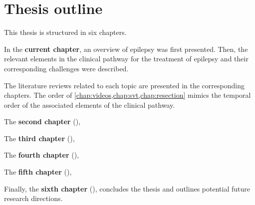 \section{Thesis outline}


This thesis is structured in six chapters.

In the \textbf{current chapter}, an overview of epilepsy was first presented.
Then, the relevant elements in the clinical pathway for the treatment of epilepsy and their corresponding challenges were described.

The literature reviews related to each topic are presented in the corresponding chapters.
The order of \cref{chap:videos,chap:svt,chap:resection} mimics the temporal order of the associated elements of the clinical pathway.

The \textbf{second chapter} (),

The \textbf{third chapter} (),

The \textbf{fourth chapter} (),

The \textbf{fifth chapter} (),

Finally, the \textbf{sixth chapter} (), concludes the thesis and outlines potential future research directions.
